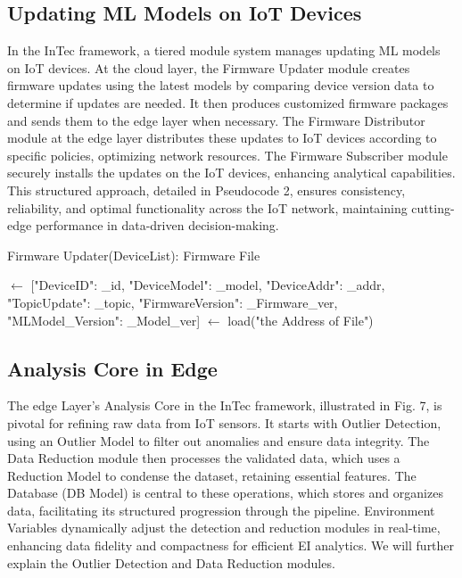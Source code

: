 \documentclass[11pt]{article}
\begin{document}
	\subsection{Updating ML Models on IoT Devices}
	In the InTec framework, a tiered module system manages updating ML models on
	IoT devices. At the cloud layer, the Firmware Updater module creates firmware
	updates using the latest models by comparing device version data to determine if
	updates are needed. It then produces customized firmware packages and sends them to the edge layer when necessary. The Firmware Distributor module at the edge layer
	distributes these updates to IoT devices according to specific policies, optimizing
	network resources. The Firmware Subscriber module securely installs the updates
	on the IoT devices, enhancing analytical capabilities. This structured approach,
	detailed in Pseudocode 2, ensures consistency, reliability, and optimal functionality across the IoT network, maintaining cutting-edge performance in data-driven
	decision-making.
	
	\begin{algorithm}[H]
		
		\caption{Firmware Updater(DeviceList): Firmware File}\label{alg:firmware-updater}
		
		\BlankLine
		\DeviceList $\leftarrow$ [{"DeviceID": \_id, "DeviceModel": \_model, "DeviceAddr": \_addr, "TopicUpdate": \_topic, "FirmwareVersion": \_Firmware\_ver, "MLModel\_Version": \_Model\_ver}]\;
		\MLModelFile $\leftarrow$ load("the Address of File")\;
		
		\BlankLine
	\end{algorithm}	
	
	\subsection{Analysis Core in Edge}
	The edge Layer’s Analysis Core in the InTec framework, illustrated in Fig. 7, is pivotal for refining raw data from IoT sensors. It starts with Outlier Detection, using an
	Outlier Model to filter out anomalies and ensure data integrity. The Data Reduction
	module then processes the validated data, which uses a Reduction Model to condense the dataset, retaining essential features. The Database (DB Model) is central
	to these operations, which stores and organizes data, facilitating its structured progression through the pipeline. Environment Variables dynamically adjust the detection and reduction modules in real-time, enhancing data fidelity and compactness for
	efficient EI analytics. We will further explain the Outlier Detection and Data Reduction modules.
	
\end{document}

